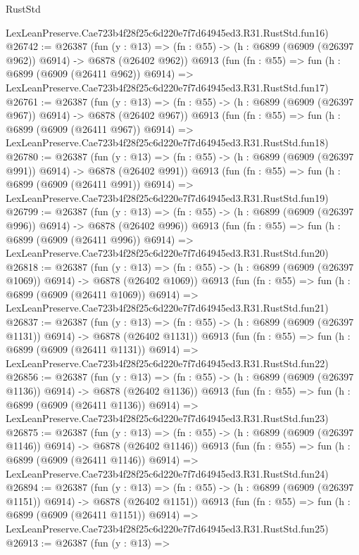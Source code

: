 \begin{lexlean}{RustStd}
\begin{coremodule}
    LexLeanPreserve.Cae723b4f28f25c6d220e7f7d64945ed3.R31.RustStd.fun16)
@26742 := @26387
    (fun (y : @13) => (fn : @55) -> (h : @6899 (@6909 (@26397 @962)) @6914) -> @6878 (@26402 @962))
    @6913
    (fun (fn : @55) =>
    fun (h : @6899 (@6909 (@26411 @962)) @6914) =>
    LexLeanPreserve.Cae723b4f28f25c6d220e7f7d64945ed3.R31.RustStd.fun17)
@26761 := @26387
    (fun (y : @13) => (fn : @55) -> (h : @6899 (@6909 (@26397 @967)) @6914) -> @6878 (@26402 @967))
    @6913
    (fun (fn : @55) =>
    fun (h : @6899 (@6909 (@26411 @967)) @6914) =>
    LexLeanPreserve.Cae723b4f28f25c6d220e7f7d64945ed3.R31.RustStd.fun18)
@26780 := @26387
    (fun (y : @13) => (fn : @55) -> (h : @6899 (@6909 (@26397 @991)) @6914) -> @6878 (@26402 @991))
    @6913
    (fun (fn : @55) =>
    fun (h : @6899 (@6909 (@26411 @991)) @6914) =>
    LexLeanPreserve.Cae723b4f28f25c6d220e7f7d64945ed3.R31.RustStd.fun19)
@26799 := @26387
    (fun (y : @13) => (fn : @55) -> (h : @6899 (@6909 (@26397 @996)) @6914) -> @6878 (@26402 @996))
    @6913
    (fun (fn : @55) =>
    fun (h : @6899 (@6909 (@26411 @996)) @6914) =>
    LexLeanPreserve.Cae723b4f28f25c6d220e7f7d64945ed3.R31.RustStd.fun20)
@26818 := @26387
    (fun (y : @13) =>
    (fn : @55) -> (h : @6899 (@6909 (@26397 @1069)) @6914) -> @6878 (@26402 @1069))
    @6913
    (fun (fn : @55) =>
    fun (h : @6899 (@6909 (@26411 @1069)) @6914) =>
    LexLeanPreserve.Cae723b4f28f25c6d220e7f7d64945ed3.R31.RustStd.fun21)
@26837 := @26387
    (fun (y : @13) =>
    (fn : @55) -> (h : @6899 (@6909 (@26397 @1131)) @6914) -> @6878 (@26402 @1131))
    @6913
    (fun (fn : @55) =>
    fun (h : @6899 (@6909 (@26411 @1131)) @6914) =>
    LexLeanPreserve.Cae723b4f28f25c6d220e7f7d64945ed3.R31.RustStd.fun22)
@26856 := @26387
    (fun (y : @13) =>
    (fn : @55) -> (h : @6899 (@6909 (@26397 @1136)) @6914) -> @6878 (@26402 @1136))
    @6913
    (fun (fn : @55) =>
    fun (h : @6899 (@6909 (@26411 @1136)) @6914) =>
    LexLeanPreserve.Cae723b4f28f25c6d220e7f7d64945ed3.R31.RustStd.fun23)
@26875 := @26387
    (fun (y : @13) =>
    (fn : @55) -> (h : @6899 (@6909 (@26397 @1146)) @6914) -> @6878 (@26402 @1146))
    @6913
    (fun (fn : @55) =>
    fun (h : @6899 (@6909 (@26411 @1146)) @6914) =>
    LexLeanPreserve.Cae723b4f28f25c6d220e7f7d64945ed3.R31.RustStd.fun24)
@26894 := @26387
    (fun (y : @13) =>
    (fn : @55) -> (h : @6899 (@6909 (@26397 @1151)) @6914) -> @6878 (@26402 @1151))
    @6913
    (fun (fn : @55) =>
    fun (h : @6899 (@6909 (@26411 @1151)) @6914) =>
    LexLeanPreserve.Cae723b4f28f25c6d220e7f7d64945ed3.R31.RustStd.fun25)
@26913 := @26387
    (fun (y : @13) =>

\end{coremodule}
\end{lexlean}

